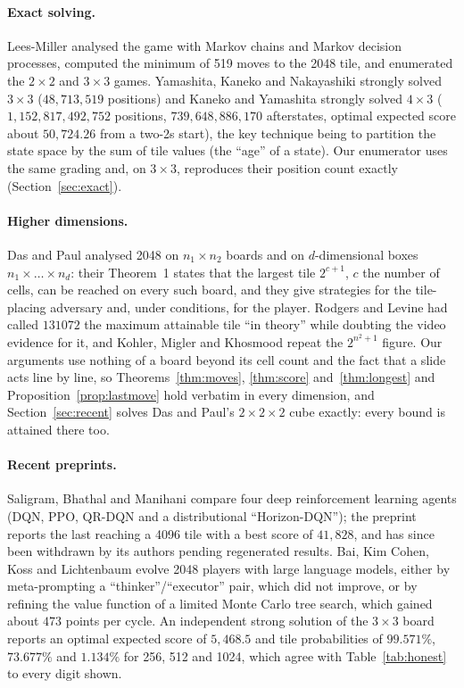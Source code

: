 \documentclass[11pt]{article}
\theoremstyle{definition}
\theoremstyle{remark}
\begin{document}
\paragraph{Exact solving.} Lees-Miller \cite{leesmiller2017,leesmiller2017b,leesmiller2018}
analysed the game with Markov chains and Markov decision processes,
computed the minimum of 519 moves to the 2048 tile, and enumerated the
$2\times2$ and $3\times3$ games. Yamashita, Kaneko and Nakayashiki
\cite{yamashita2022} strongly solved $3\times3$ ($48{,}713{,}519$ positions)
and Kaneko and Yamashita \cite{kaneko2026} strongly solved $4\times3$
($1{,}152{,}817{,}492{,}752$ positions, $739{,}648{,}886{,}170$ afterstates,
optimal expected score about $50{,}724.26$ from a two-2s start), the key
technique being to partition the state space by the sum of tile values
(the ``age'' of a state). Our enumerator uses the same grading and, on
$3\times3$, reproduces their position count exactly
(Section~\ref{sec:exact}).

\paragraph{Higher dimensions.} Das and Paul \cite{daspaul2018} analysed
2048 on $n_1\times n_2$ boards and on $d$-dimensional boxes
$n_1\times\dots\times n_d$: their Theorem~1 states that the largest tile
$2^{c+1}$, $c$ the number of cells, can be reached on every such board,
and they give strategies for the tile-placing adversary and, under
conditions, for the player. Rodgers and Levine \cite{rodgers2014} had
called $131072$ the maximum attainable tile ``in theory'' while doubting
the video evidence for it, and Kohler, Migler and Khosmood
\cite{kohler2019} repeat the $2^{n^2+1}$ figure. Our arguments use
nothing of a board beyond its cell count and the fact that a slide acts
line by line, so Theorems~\ref{thm:moves}, \ref{thm:score}
and~\ref{thm:longest} and Proposition~\ref{prop:lastmove} hold verbatim
in every dimension, and Section~\ref{sec:recent} solves Das and Paul's
$2\times2\times2$ cube exactly: every bound is attained there too.

\paragraph{Recent preprints.} Saligram, Bhathal and Manihani
\cite{saligram2025} compare four deep reinforcement learning agents
(DQN, PPO, QR-DQN and a distributional ``Horizon-DQN''); the preprint
reports the last reaching a 4096 tile with a best score of $41{,}828$,
and has since been withdrawn by its authors pending regenerated results.
Bai, Kim Cohen, Koss and Lichtenbaum \cite{bai2025} evolve 2048 players
with large language models, either by meta-prompting a
``thinker''/``executor'' pair, which did not improve, or by refining the
value function of a limited Monte Carlo tree search, which gained about
$473$ points per cycle. An independent strong solution of the
$3\times3$ board \cite{probabilitysports} reports an optimal expected
score of $5{,}468.5$ and tile probabilities of $99.571\%$, $73.677\%$ and
$1.134\%$ for 256, 512 and 1024, which agree with Table~\ref{tab:honest}
to every digit shown.
\end{document}
